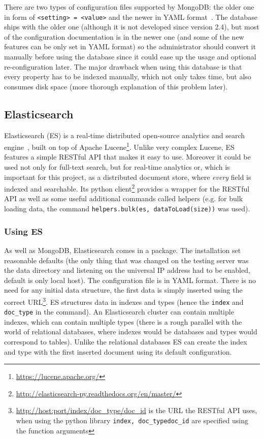 There are two types
of configuration files supported by MongoDB: the older one in form of \texttt{<setting> = <value>} and the 
newer in YAML format~\cite{YAML}. The database ships with the older one (although it is not developed since version 2.4), but
most of the configuration documentation is in the newer one (and some of the new features can be only set in 
YAML format) so the administrator should convert it manually before using the database since it could ease up
the usage and optional re-configuration later.
The major drawback when using this database is that every property has to be indexed manually, which not only 
takes time, but also consumes disk space (more thorough explanation of this problem later).


\subsection{Elasticsearch}

Elasticsearch (ES) is a real-time distributed open-source analytics and search engine~\cite{ESBook}, 
built on top of Apache Lucene\footnote{\url{https://lucene.apache.org/}}. Unlike very complex Lucene, 
ES features a simple RESTful API that makes it easy to use. Moreover it could be used not only 
for full-text search, but for real-time analytics or, which is important for this project, as a 
distributed document store, where \textit{every} field is indexed and searchable. Its python 
client\footnote{\url{http://elasticsearch-py.readthedocs.org/en/master/}} provides a wrapper for the RESTful API
as well as some useful additional commands called helpers (e.g. for bulk loading data, the command 
\texttt{helpers.bulk(es, dataToLoad(size))} was used).

\subsubsection{Using ES}

As well as MongoDB, Elasticsearch comes in a package. The installation set reasonable 
defaults (the only thing that was changed on the testing server was the data directory and listening on the 
universal IP address had to be enabled, default is only local host). The 
configuration file is in YAML format. There is no need for any initial data structure,
the first data is simply inserted using the correct URL\footnote{\url{http://host:port/index/doc_type/doc_id}
is the URL the RESTful API uses, when using the python library \texttt{index, doc\_type}\texttt{doc\_id} are 
specified using the function arguments}. ES structures data in indexes and types (hence the \texttt{index} and
\texttt{doc\_type} in the command). An Elasticsearch cluster can contain multiple indexes, which can contain 
multiple types (there is a rough parallel with the world of relational databases, where indexes would be databases 
and types would correspond to tables). Unlike the relational databases ES can create the index and type with the 
first inserted document using its default configuration.

